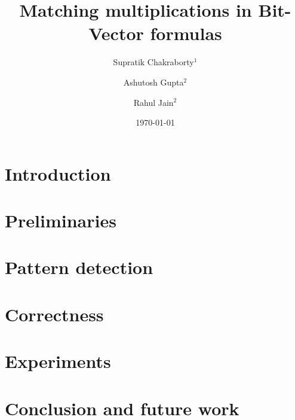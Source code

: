\documentclass[draft]{llncs}
\begin{document}
\title{Matching multiplications in Bit-Vector formulas}

\author{Supratik Chakraborty$^1$ \and Ashutosh Gupta$^2$ \and Rahul Jain$^2$}


\date{\today}

\maketitle
\begin{abstract}

\end{abstract}

\section{Introduction}
\label{sec:intro}


\section{Preliminaries}
\label{sec:prelim}


\section{Pattern detection}
\label{sec:pattern}


\section{Correctness}
\label{sec:correct}


\section{Experiments}
\label{sec:experiments}



% 

\section{Conclusion and future work}
\label{sec:conclusion}




\end{document}
